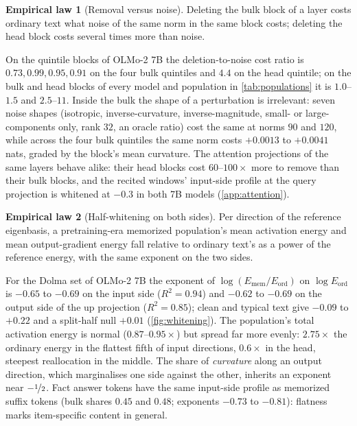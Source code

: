 \documentclass{article}
\theoremstyle{definition}\newtheorem{law}{Empirical law}
\begin{document}
\begin{law}[Removal versus noise]\label{law:asym}
Deleting the bulk block of a layer costs ordinary text what noise of the same norm in the same block costs; deleting the head block costs several times more than noise.
\end{law}
On the quintile blocks of OLMo-2 7B the deletion-to-noise cost ratio is $0.73,0.99,0.95,0.91$ on the four bulk quintiles and $4.4$ on the head quintile; on the bulk and head blocks of every model and population in \cref{tab:populations} it is $1.0$--$1.5$ and $2.5$--$11$. Inside the bulk the shape of a perturbation is irrelevant: seven noise shapes (isotropic, inverse-curvature, inverse-magnitude, small- or large-components only, rank $32$, an oracle ratio) cost the same at norms $90$ and $120$, while across the four bulk quintiles the same norm costs $+0.0013$ to $+0.0041$ nats, graded by the block's mean curvature. The attention projections of the same layers behave alike: their head blocks cost $60$--$100\times$ more to remove than their bulk blocks, and the recited windows' input-side profile at the query projection is whitened at $-0.3$ in both 7B models (\cref{app:attention}).

\begin{law}[Half-whitening on both sides]\label{law:whiten}
Per direction of the reference eigenbasis, a pretraining-era memorized population's mean activation energy and mean output-gradient energy fall relative to ordinary text's as a power of the reference energy, with the same exponent on the two sides.
\end{law}
For the Dolma set of OLMo-2 7B the exponent of $\log(E_{\mathrm{mem}}/E_{\mathrm{ord}})$ on $\log E_{\mathrm{ord}}$ is $-0.65$ to $-0.69$ on the input side ($R^2=0.94$) and $-0.62$ to $-0.69$ on the output side of the up projection ($R^2=0.85$); clean and typical text give $-0.09$ to $+0.22$ and a split-half null $+0.01$ (\cref{fig:whitening}). The population's total activation energy is normal ($0.87$--$0.95\times$) but spread far more evenly: $2.75\times$ the ordinary energy in the flattest fifth of input directions, $0.6\times$ in the head, steepest reallocation in the middle. The share of \emph{curvature} along an output direction, which marginalises one side against the other, inherits an exponent near $-\nicefrac12$. Fact answer tokens have the same input-side profile as memorized suffix tokens (bulk shares $0.45$ and $0.48$; exponents $-0.73$ to $-0.81$): flatness marks item-specific content in general.
\end{document}
